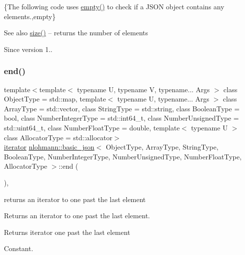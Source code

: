\{The following code uses {\ttfamily \hyperlink{classnlohmann_1_1basic__json_ae3fe0423252e171973cdd5786d036e30}{empty()}} to check if a J\+S\+ON object contains any elements.,empty\}

\begin{DoxySeeAlso}{See also}
\hyperlink{classnlohmann_1_1basic__json_a0ea8a1ecca4b3cb0ba09ad7552c364b6}{size()} -- returns the number of elements
\end{DoxySeeAlso}
\begin{DoxySince}{Since}
version 1.. 
\end{DoxySince}
\hypertarget{classnlohmann_1_1basic__json_a12ccf14d39ddae52f6c7e126105a230b}{}\label{classnlohmann_1_1basic__json_a12ccf14d39ddae52f6c7e126105a230b} 
\subsubsection{\texorpdfstring{end()}{end()}\hspace{0.1cm}{\footnotesize\ttfamily [1/2]}}
{\footnotesize\ttfamily template$<$template$<$ typename U, typename V, typename... Args $>$ class Object\+Type = std\+::map, template$<$ typename U, typename... Args $>$ class Array\+Type = std\+::vector, class String\+Type  = std\+::string, class Boolean\+Type  = bool, class Number\+Integer\+Type  = std\+::int64\+\_\+t, class Number\+Unsigned\+Type  = std\+::uint64\+\_\+t, class Number\+Float\+Type  = double, template$<$ typename U $>$ class Allocator\+Type = std\+::allocator$>$ \\
\hyperlink{classnlohmann_1_1basic__json_1_1iterator}{iterator} \hyperlink{classnlohmann_1_1basic__json}{nlohmann\+::basic\+\_\+json}$<$ Object\+Type, Array\+Type, String\+Type, Boolean\+Type, Number\+Integer\+Type, Number\+Unsigned\+Type, Number\+Float\+Type, Allocator\+Type $>$\+::end (\begin{DoxyParamCaption}{ }\end{DoxyParamCaption})\hspace{0.3cm}{\ttfamily [inline]}, {\ttfamily [noexcept]}}



returns an iterator to one past the last element 

Returns an iterator to one past the last element.

 \begin{DoxyReturn}{Returns}
iterator one past the last element
\end{DoxyReturn}
Constant.

